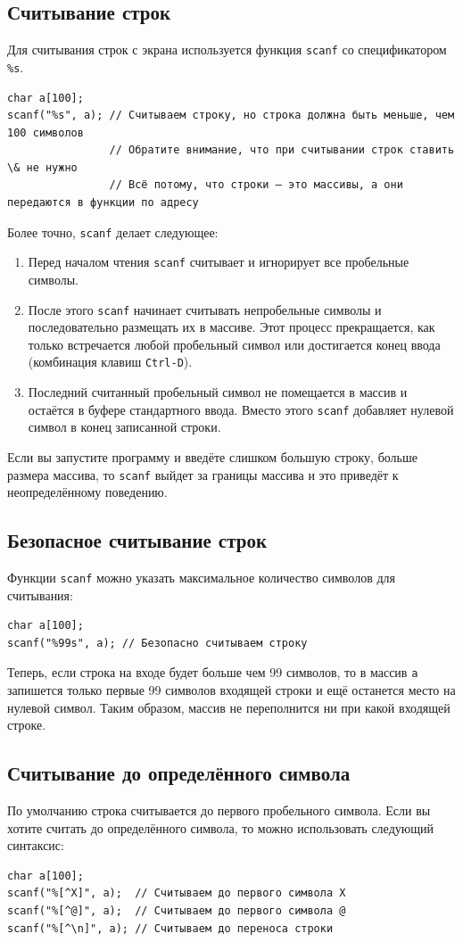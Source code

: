 \documentclass{article}
\begin{document}
\subsection*{Считывание строк}
Для считывания строк с экрана используется функция \texttt{scanf} со спецификатором \texttt{\%s}. 
\begin{lstlisting}
char a[100];
scanf("%s", a); // Считываем строку, но строка должна быть меньше, чем 100 символов
                // Обратите внимание, что при считывании строк ставить \& не нужно
                // Всё потому, что строки — это массивы, а они передаются в функции по адресу
\end{lstlisting}
Более точно, \texttt{scanf} делает следующее:
\begin{enumerate}
\item Перед началом чтения \texttt{scanf} считывает и игнорирует все пробельные символы.
\item После этого \texttt{scanf} начинает считывать непробельные символы и последовательно размещать их в массиве. Этот процесс прекращается, как только встречается любой пробельный символ или достигается конец ввода (комбинация клавиш \texttt{Ctrl-D}).
\item Последний считанный пробельный символ не помещается в массив и остаётся в буфере стандартного ввода. Вместо этого \texttt{scanf} добавляет нулевой символ в конец записанной строки.
\end{enumerate}
Если вы запустите программу и введёте слишком большую строку, больше размера массива, то \texttt{scanf} выйдет за границы массива и это приведёт к неопределённому поведению.

\subsection*{Безопасное считывание строк}
Функции \texttt{scanf} можно указать максимальное количество символов для считывания:
\begin{lstlisting}
char a[100];
scanf("%99s", a); // Безопасно считываем строку
\end{lstlisting}
Теперь, если строка на входе будет больше чем 99 символов, то в массив \texttt{a} запишется только первые 99 символов входящей строки и ещё останется место на нулевой символ. Таким образом, массив не переполнится ни при какой входящей строке.

\subsection*{Считывание до определённого символа}
По умолчанию строка считывается до первого пробельного символа. Если вы хотите считать до определённого символа, то можно использовать следующий синтаксис:
\begin{lstlisting}
char a[100];
scanf("%[^X]", a);  // Считываем до первого символа X
scanf("%[^@]", a);  // Считываем до первого символа @
scanf("%[^\n]", a); // Считываем до переноса строки
\end{lstlisting}
\end{document}
